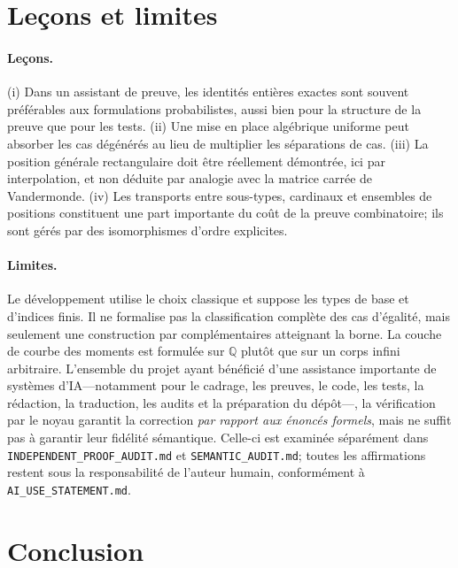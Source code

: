 \documentclass[11pt]{article}
\newcommand{\QQ}{\mathbb{Q}}
\begin{document}
\section{Leçons et limites}\label{sec:lim}

\paragraph{Leçons.} (i) Dans un assistant de preuve, les identités entières exactes sont
souvent préférables aux formulations probabilistes, aussi bien pour la structure de la
preuve que pour les tests. (ii) Une mise en place algébrique uniforme peut absorber les
cas dégénérés au lieu de multiplier les séparations de cas. (iii) La position générale
rectangulaire doit être réellement démontrée, ici par interpolation, et non déduite par
analogie avec la matrice carrée de Vandermonde. (iv) Les transports entre sous-types,
cardinaux et ensembles de positions constituent une part importante du coût de la
preuve combinatoire; ils sont gérés par des isomorphismes d'ordre explicites.

\paragraph{Limites.} Le développement utilise le choix classique et suppose les types
de base et d'indices finis. Il ne formalise pas la classification complète des cas
d'égalité, mais seulement une construction par complémentaires atteignant la borne. La
couche de courbe des moments est formulée sur $\QQ$ plutôt que sur un corps infini
arbitraire. L'ensemble du projet ayant bénéficié d'une assistance importante de systèmes d'IA---notamment pour le cadrage, les preuves, le code, les tests, la rédaction, la traduction, les audits et la préparation du dépôt---,
la vérification par le noyau garantit la correction \emph{par rapport aux énoncés
formels}, mais ne suffit pas à garantir leur fidélité sémantique. Celle-ci est examinée
séparément dans \texttt{INDEPENDENT\_PROOF\_AUDIT.md} et
\texttt{SEMANTIC\_AUDIT.md}; toutes les affirmations restent sous la responsabilité de
l'auteur humain, conformément à \texttt{AI\_USE\_STATEMENT.md}.

\section{Conclusion}\label{sec:concl}
\end{document}
